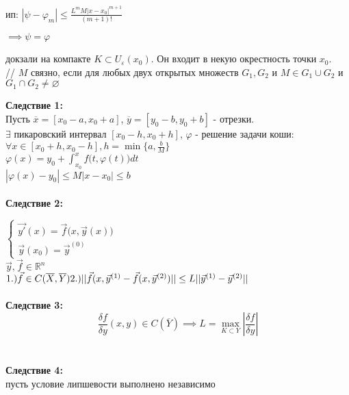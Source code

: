 \documentclass[12pt, a4paper]{article}
\begin{document}
ип: $| \psi - \varphi_m| \le \frac{L^m M |x-x_0|^{m+1}}{(m+1)!}$

$\implies \psi = \varphi$

докзали на компакте $K \subset U_\varepsilon(x_0)$. Он входит в некую окрестность точки $x_0$.\\
// $M$ связно, если для любых двух открытых множеств $G_1, G_2$ и $M \in G_1 \cup G_2$ и $G_1 \cap G_2 \neq \varnothing$ 

\textbf{Следствие 1:}\\ 
Пусть $\overline{x} = [x_0-a, x_0+a]$, $\overline{y} = [y_0-b, y_0+b]$ - отрезки.\\
$\exists$ пикаровский интервал $[x_0 - h, x_0 + h]$, $\varphi $ - решение задачи коши: \\
$\forall x \in [x_0 +h, x_0-h], h = \min\{a, 
\frac{b}{M}\}$ \\
$\varphi(x) = y_0 + \int^x_{x_0}f\big(t, \varphi(t)\big)dt$\\

$|\varphi(x) - y_0| \le M|x-x_0| \le b$\\\\

\textbf{Следствие 2:}

$
\begin{cases}
\vec{y'}(x) = \vec{f}\big(x, \vec{y}(x)\big)\\
\vec{y}(x_0) = \vec{y}^{(0)}

\end{cases}$ \\

$\vec{y}, \vec{f} \in \mathbb{R}^n$ \\

$1.) \vec{f} \in C(\overline{X}, \overline{Y})\\
 2.) || \vec{f}(x, \vec{y}^{(1)} - \vec{f}(x, \vec{y}^{(2)}) || \le L|| \vec{y}^{(1)} - \vec{y}^{(2)} ||$\\\\

\textbf{Следствие 3:}\\
$$\frac{\delta f}{\delta y}(x, y) \in C(\overline{Y}) \implies L = \max_{K \subset Y} |\frac{\delta f}{\delta y}|$$\\\\

\textbf{Следствие 4:}\\

пусть условие липшевости выполнено независимо\\
\end{document}
